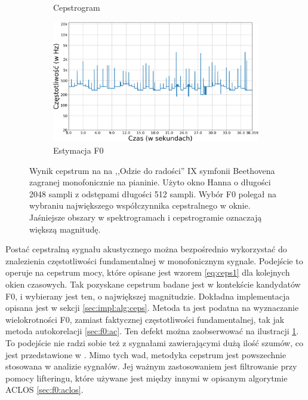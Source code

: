 \documentclass[12pt,a4paper,twoside]{mwart}
\begin{document}
\begin{figure}[t]
\begin{subfigure}{.49\textwidth}
    \caption{Cepstrogram}
  \end{subfigure}
  \begin{subfigure}{.5\textwidth}
    \centering
    \includegraphics[width=1.\linewidth]{images/Cepstrum/estymacjaF0_cropped.png}
    \caption{Estymacja F0}
  \end{subfigure}
  \caption{Wynik cepstrum na na ,,Odzie do radości'' IX symfonii Beethovena zagranej monofonicznie na pianinie. Użyto okno Hanna o długości 2048 sampli z odstępami długości 512 sampli. Wybór F0 polegał na wybraniu największego współczynnika cepstralnego w oknie. Jaśniejsze obszary w spektrogramach i cepstrogramie oznaczają większą magnitudę.}
  \label{fig:cepstrumF0}
\end{figure}

Postać cepstralną sygnału akustycznego można bezpośrednio wykorzystać do znalezienia częstotliwości fundamentalnej w monofonicznym sygnale. Podejście to operuje na cepstrum mocy, które opisane jest wzorem \ref{eq:ceps1} dla kolejnych okien czasowych. Tak pozyskane cepstrum badane jest w kontekście kandydatów F0, i wybierany jest ten, o największej magnitudzie. Dokładna implementacja opisana jest w sekcji \ref{sec:impl:alg:ceps}. Metoda ta jest podatna na wyznaczanie wielokrotności F0, zamiast faktycznej częstotliwości fundamentalnej, tak jak metoda autokorelacji \ref{sec:f0:ac}. Ten defekt można zaobserwować na ilustracji \ref{fig:cepstrumF0}. To podejście nie radzi sobie też z sygnałami zawierającymi dużą ilość szumów, co jest przedstawione w 
\cite[233-235]{Transcription:Kunieda:Aclos}
. Mimo tych wad, metodyka cepstrum jest powszechnie stosowana w analizie sygnałów. Jej ważnym zastosowaniem jest filtrowanie przy pomocy lifteringu, które używane jest między innymi w opisanym algorytmie ACLOS \ref{sec:f0:aclos}.
\end{document}
